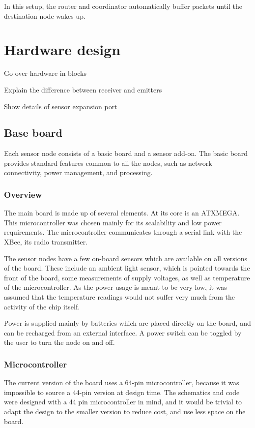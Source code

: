 In this setup, the router and coordinator automatically buffer packets until the
destination node wakes up.

\section{Hardware design}

Go over hardware in blocks

Explain the difference between receiver and emitters

Show details of sensor expansion port

\subsection{Base board}

Each sensor node consists of a basic board and a sensor add-on. The basic board
provides standard features common to all the nodes, such as network
connectivity, power management, and processing.

\subsubsection{Overview}

The main board is made up of several elements. At its core is an ATXMEGA. This
microcontroller was chosen mainly for its scalability and low power
requirements. The microcontroller communicates through a serial link with the
XBee, its radio transmitter.

The sensor nodes have a few on-board sensors which are available on all versions
of the board. These include an ambient light sensor, which is pointed towards
the front of the board, some measurements of supply voltages, as well as
temperature of the microcontroller. As the power usage is meant to be very low,
it was assumed that the temperature readings would not suffer very much from
the activity of the chip itself.

Power is supplied mainly by batteries which are placed directly on the board,
and can be recharged from an external interface. A power switch can be toggled
by the user to turn the node on and off.

\subsubsection{Microcontroller}

The current version of the board uses a 64-pin microcontroller, because it
was impossible to source a 44-pin version at design time. The schematics and
code were designed with a 44 pin microcontroller in mind, and it would be
trivial to adapt the design to the smaller version to reduce cost, and use less
space on the board.

